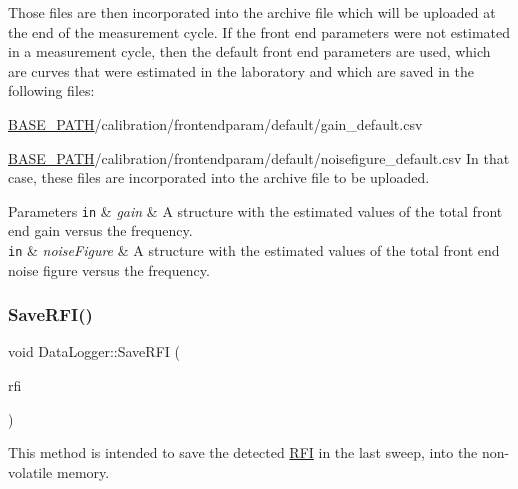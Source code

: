 Those files are then incorporated into the archive file which will be uploaded at the end of the measurement cycle. If the front end parameters were not estimated in a measurement cycle, then the default front end parameters are used, which are curves that were estimated in the laboratory and which are saved in the following files\+:
\begin{DoxyItemize}
\item \hyperlink{Basics_8h_a0423f4cb393331ce0b9f6b3a43adcaae}{B\+A\+S\+E\+\_\+\+P\+A\+TH}/calibration/frontendparam/default/gain\+\_\+default.csv
\item \hyperlink{Basics_8h_a0423f4cb393331ce0b9f6b3a43adcaae}{B\+A\+S\+E\+\_\+\+P\+A\+TH}/calibration/frontendparam/default/noisefigure\+\_\+default.csv In that case, these files are incorporated into the archive file to be uploaded. 
\begin{DoxyParams}[1]{Parameters}
\mbox{\tt in}  & {\em gain} & A structure with the estimated values of the total front end gain versus the frequency. \\
\hline
\mbox{\tt in}  & {\em noise\+Figure} & A structure with the estimated values of the total front end noise figure versus the frequency. \\
\hline
\end{DoxyParams}

\end{DoxyItemize}\mbox{\label{classDataLogger_a0c772c3529adc3759ba0e1e596500f65}} 
\subsubsection{\texorpdfstring{Save\+R\+F\+I()}{SaveRFI()}}
{\footnotesize\ttfamily void Data\+Logger\+::\+Save\+R\+FI (\begin{DoxyParamCaption}\item[{const \hyperlink{structRFI}{R\+FI} \&}]{rfi }\end{DoxyParamCaption})}



This method is intended to save the detected \hyperlink{structRFI}{R\+FI} in the last sweep, into the non-\/volatile memory. 

